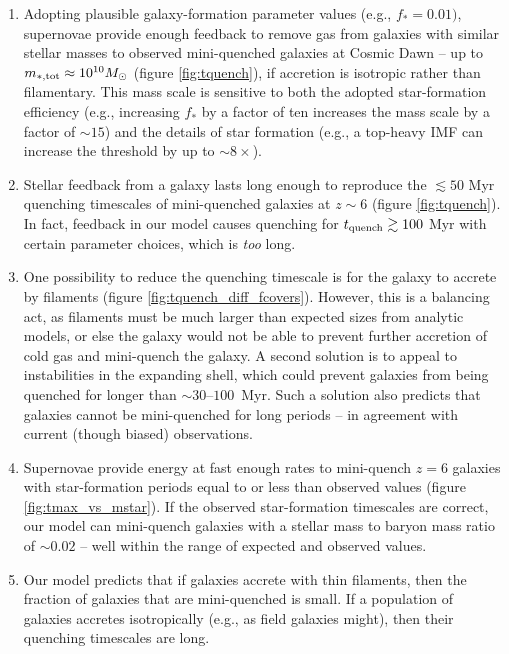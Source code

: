\documentclass[a4paper,11pt]{article}
\begin{document}
\begin{enumerate}
    \item Adopting plausible galaxy-formation parameter values (e.g., $f_{*} = 0.01)$, supernovae provide enough feedback to remove gas from galaxies with similar stellar masses to observed mini-quenched galaxies at Cosmic Dawn -- up to $m_{*, \rm tot} \approx 10^{10} M_{\odot}$ (figure \ref{fig:tquench}), if accretion is isotropic rather than filamentary. This mass scale is sensitive to both the adopted star-formation efficiency (e.g., increasing $f_{*}$ by a factor of ten increases the mass scale by a factor of $\sim 15$) and the details of star formation (e.g., a top-heavy IMF can increase the threshold by up to $\sim 8 \times$).
    \item Stellar feedback from a galaxy lasts long enough to reproduce the $\lesssim 50$ Myr quenching timescales of mini-quenched galaxies at $z \sim 6$ (figure \ref{fig:tquench}). In fact, feedback in our model causes quenching for $t_{\rm quench} \gtrsim 100$ Myr with certain parameter choices, which is \textit{too} long.
    \item One possibility to reduce the quenching timescale is for the galaxy to accrete by filaments (figure \ref{fig:tquench_diff_fcovers}). However, this is a balancing act, as filaments must be much larger than expected sizes from analytic models, or else the galaxy would not be able to prevent further accretion of cold gas and mini-quench the galaxy. 
    A second solution is to appeal to instabilities in the expanding shell, which could prevent galaxies from being quenched for longer than $\sim 30$--$100$~Myr. Such a solution also predicts that galaxies cannot be mini-quenched for long periods -- in agreement with current (though biased) observations.
    \item Supernovae provide energy at fast enough rates to mini-quench $z = 6$ galaxies with star-formation periods equal to or less than observed values (figure \ref{fig:tmax_vs_mstar}). If the observed star-formation timescales are correct, our model can mini-quench galaxies with a stellar mass to baryon mass ratio of $\sim 0.02$ -- well within the range of expected and observed values. 
    \item Our model predicts that if galaxies accrete with thin filaments, then the fraction of galaxies that are mini-quenched is small. If a population of galaxies accretes isotropically (e.g., as field galaxies might), then their quenching timescales are long.
\end{enumerate}
\end{document}
